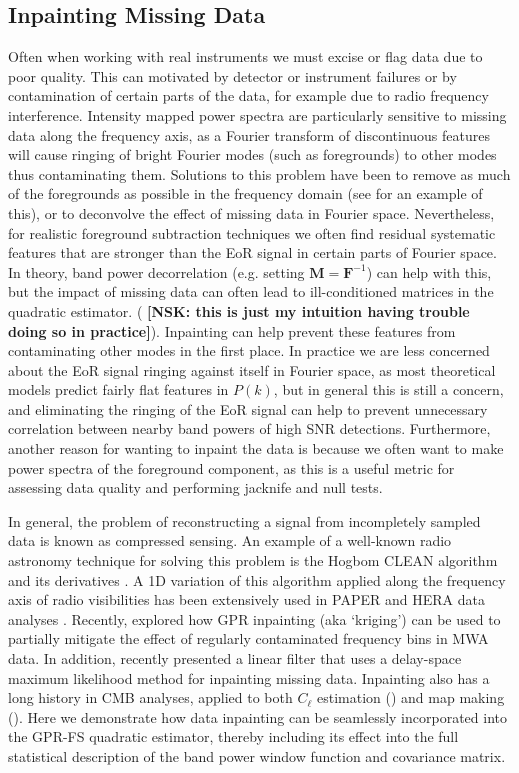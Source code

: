 \documentclass[a4paper,fleqn,usenatbib]{mnras}
\newcommand{\nsk}[1]{{\color{blue} \textbf{[NSK:  #1]}}}
\def\F{\boldsymbol{F}}
\def\M{\boldsymbol{M}}
\begin{document}
\subsection{Inpainting Missing Data}
\label{sec:inpainting}
Often when working with real instruments we must excise or flag data due to poor quality.
This can motivated by detector or instrument failures or by contamination of certain parts of the data, for example due to radio frequency interference.
Intensity mapped power spectra are particularly sensitive to missing data along the frequency axis, as a Fourier transform of discontinuous features will cause ringing of bright Fourier modes (such as foregrounds) to other modes thus contaminating them.
Solutions to this problem have been to remove as much of the foregrounds as possible in the frequency domain (see \citet{Ewall-Wice2020} for an example of this), or to deconvolve the effect of missing data in Fourier space.
Nevertheless, for realistic foreground subtraction techniques we often find residual systematic features that are stronger than the EoR signal in certain parts of Fourier space.
In theory, band power decorrelation (e.g. setting $\M=\F^{-1}$) can help with this, but the impact of missing data can often lead to ill-conditioned matrices in the quadratic estimator. (\nsk{this is just my intuition having trouble doing so in practice}).
Inpainting can help prevent these features from contaminating other modes in the first place.
In practice we are less concerned about the EoR signal ringing against itself in Fourier space, as most theoretical models predict fairly flat features in $P(k)$, but in general this is still a concern, and eliminating the ringing of the EoR signal can help to prevent unnecessary correlation between nearby band powers of high SNR detections.
Furthermore, another reason for wanting to inpaint the data is because we often want to make power spectra of the foreground component, as this is a useful metric for assessing data quality and performing jacknife and null tests.

In general, the problem of reconstructing a signal from incompletely sampled data is known as compressed sensing.
An example of a well-known radio astronomy technique for solving this problem is the Hogbom CLEAN algorithm and its derivatives \citep{Hogbom1974}.
A 1D variation of this algorithm applied along the frequency axis of radio visibilities has been extensively used in PAPER and HERA data analyses \citep{Parsons2009, Ali2015, Kerrigan2018, Kern2020a}.
Recently, \citet{Trott2020} explored how GPR inpainting (aka `kriging') can be used to partially mitigate the effect of regularly contaminated frequency bins in MWA data.
In addition, \citet{Ewall-Wice2020} recently presented a linear filter that uses a delay-space maximum likelihood method for inpainting missing data.
Inpainting also has a long history in CMB analyses, applied to both $C_\ell$ estimation () and map making ().
Here we demonstrate how data inpainting can be seamlessly incorporated into the GPR-FS quadratic estimator, thereby including its effect into the full statistical description of the band power window function and covariance matrix.
\end{document}
